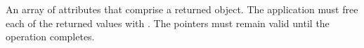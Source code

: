 An array of attributes that comprise a returned object.  The application must
free each of the returned values with .
The pointers must remain valid until the operation completes.
